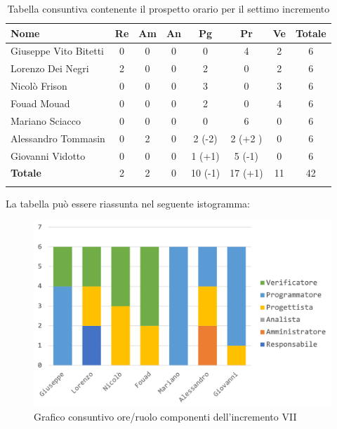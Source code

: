 			\begin{longtable}{|l|c|c|c|c|c|c|c|}
				\hline
				\rowcolor{lighter-grayer}
				\textbf{Nome} & \textbf{Re} & \textbf{Am} & \textbf{An} & \textbf{Pg}  & \textbf{Pr}   & \textbf{Ve} & \textbf{Totale} \\
				\hline
				\endfirsthead
				
				\hline
				Giuseppe Vito Bitetti 		 & 0 & 0 & 0 & 0 & 4 & 2 & 6\\
				\hline
				\hline
				Lorenzo Dei Negri			 & 2 & 0 & 0 & 2 & 0 & 2 & 6\\
				\hline
				\hline
				Nicolò Frison				      & 0 & 0 & 0 & 3 & 0 & 3 & 6\\
				\hline
				\hline
				Fouad Mouad 				   & 0 & 0 & 0 & 2 & 0 & 4 & 6\\
				\hline
				\hline
				Mariano Sciacco 			 & 0 & 0 & 0 & 0 & 6 & 0 & 6\\
				\hline
				\hline
				Alessandro Tommasin    & 0 & 2 & 0 & 2 (-2) & 2 (+2 )& 0 & 6\\
				\hline
				\hline
				Giovanni Vidotto 			  & 0 & 0 & 0 & 1 (+1) & 5 (-1) & 0 & 6\\
				\hline 
				\textbf{Totale}			 		& 2 & 2 & 0 & 10 (-1) & 17 (+1) & 11 & 42\\
				\hline
				\caption{Tabella consuntiva contenente il prospetto orario per il settimo incremento}
			\end{longtable}
		
		La tabella può essere riassunta nel seguente istogramma:
		
		\begin{figure}[H]
			\centering
			\includegraphics[width=0.8\linewidth]{images/consuntivo/ConsIncr7-1.png}
			\caption{Grafico consuntivo ore/ruolo componenti dell'incremento VII}
			\label{fig:consuntivo grafico suddivisione ruoli incremento VII}
		\end{figure}
		\pagebreak
		
